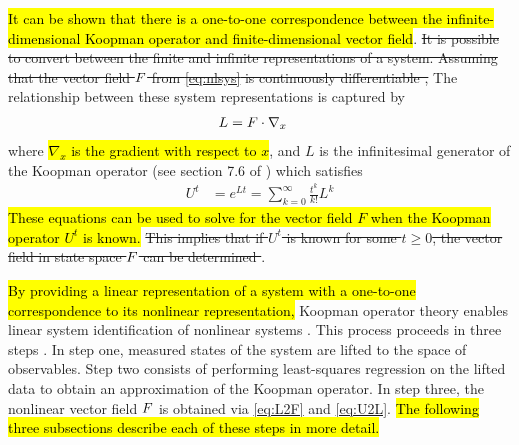 \hl{It can be shown that there is a one-to-one correspondence between the infinite-dimensional Koopman operator and finite-dimensional vector field}.
\sout{It is possible to convert between the finite and infinite representations of a system.
Assuming that the vector field $F$ from \eqref{eq:nlsys} is continuously differentiable ,}
The relationship between these system representations is captured by
\begin{align}
    L &= F \cdot \nabla_{x}
    \label{eq:L2F}
\end{align}
where \hl{$\nabla_x$ is the gradient with respect to $x$}, and $L$ is the infinitesimal generator of the Koopman operator (see section 7.6 of \cite{lasota2013chaos})  which satisfies
\begin{align}
    U^t &= e^{L t} = \sum_{k=0}^\infty \frac{t^k}{k!} L^k
    \label{eq:U2L}
\end{align}
\hl{These equations can be used to solve for the vector field $F$ when the Koopman operator $U^t$ is known.}
\sout{This implies that if $U^{t}$ is known for some $t \geq 0$, the vector field in state space $F$ can be determined \cite{koopman textbook}} .

\hl{By providing a linear representation of a system with a one-to-one correspondence to its nonlinear representation,} Koopman operator theory enables linear system identification of nonlinear systems . 
This process proceeds in three steps  .
In step one, measured states of the system are lifted to the space of observables.
Step two consists of performing least-squares regression on the lifted data to obtain an approximation of the Koopman operator.
In step three, the nonlinear vector field $F$ is obtained via \eqref{eq:L2F} and \eqref{eq:U2L}.
\hl{The following three subsections describe each of these steps in more detail.}


